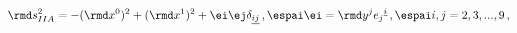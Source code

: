 \begin{equation}
\rmd s^2_{IIA}=-(\rmd x^0)^2+(\rmd x^1)^2+ \ei \ej
\delta_{\underline{ij}}\,, \espai \ei=\rmd y^j e_j{}^{\underline{i}} \,,
\espai i,j = 2,3,...,9\,,
\end{equation}


